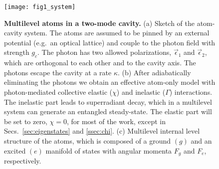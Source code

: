 \documentclass[aps,prx,superscriptaddress,twocolumn,notitlepage,nofootinbib,longbibliography]{revtex4-2}
\begin{document}
\begin{figure}[!t]
\centering
\texttt{[image: fig1\_system]}
\caption{\textbf{Multilevel atoms in a two-mode cavity.} (a) Sketch of the atom-cavity system. The atoms are assumed to be pinned by an external potential (e.g.~an optical lattice) and couple to the photon field with strength $g_c$. The photon has two allowed polarizations, $\vec{\epsilon}_1$ and $\vec{\epsilon}_2$, which are orthogonal to each other and to the cavity axis. The photons escape the cavity at a rate $\kappa$. (b) After adiabatically eliminating the photons we obtain an effective atom-only model with photon-mediated collective elastic ($\chi$) and inelastic ($\Gamma$) interactions. 
The inelastic part leads to superradiant decay, which in a multilevel system can generate an entangled steady-state. The elastic part will be set to zero, $\chi=0$, for most of the work, except in Secs.~\ref{sec:eigenstates} and \ref{ssec:chi}.
(c) Multilevel internal level structure of the atoms, which is composed of a ground $(g)$ and an excited $(e)$ manifold of states with angular momenta $F_g$ and $F_e$, respectively.}
\label{fig:system}
\end{figure}
\end{document}

